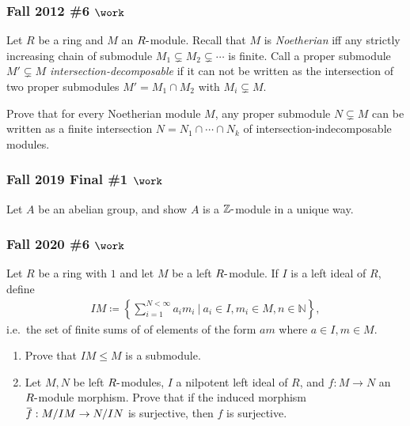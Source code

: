 \hypertarget{fall-2012-6-work}{%
\subsubsection{\texorpdfstring{Fall 2012 \#6
\(\work\)}{Fall 2012 \#6 \textbackslash work}}\label{fall-2012-6-work}}

Let \(R\) be a ring and \(M\) an \(R{\hbox{-}}\)module. Recall that
\(M\) is \emph{Noetherian} iff any strictly increasing chain of
submodule \(M_1 \subsetneq M_2 \subsetneq \cdots\) is finite. Call a
proper submodule \(M' \subsetneq M\) \emph{intersection-decomposable} if
it can not be written as the intersection of two proper submodules
\(M' = M_1\cap M_2\) with \(M_i \subsetneq M\).

Prove that for every Noetherian module \(M\), any proper submodule
\(N\subsetneq M\) can be written as a finite intersection
\(N = N_1 \cap\cdots \cap N_k\) of intersection-indecomposable modules.

\hypertarget{fall-2019-final-1-work}{%
\subsubsection{\texorpdfstring{Fall 2019 Final \#1
\(\work\)}{Fall 2019 Final \#1 \textbackslash work}}\label{fall-2019-final-1-work}}

Let \(A\) be an abelian group, and show \(A\) is a
\({\mathbb{Z}}{\hbox{-}}\)module in a unique way.

\hypertarget{fall-2020-6-work}{%
\subsubsection{\texorpdfstring{Fall 2020 \#6
\(\work\)}{Fall 2020 \#6 \textbackslash work}}\label{fall-2020-6-work}}

Let \(R\) be a ring with \(1\) and let \(M\) be a left
\(R{\hbox{-}}\)module. If \(I\) is a left ideal of \(R\), define
\begin{align*}
IM \coloneqq\left\{{ \sum_{i=1}^{N < \infty} a_i m_i {~\mathrel{\Big|}~}a_i \in I, m_i \in M, n\in {\mathbb{N}}}\right\}
,\end{align*}
i.e.~the set of finite sums of of elements of the form \(am\) where
\(a\in I, m\in M\).

\begin{enumerate}
\def\labelenumi{\alph{enumi}.}
\item
  Prove that \(IM \leq M\) is a submodule.
\item
  Let \(M, N\) be left \(R{\hbox{-}}\)modules, \(I\) a nilpotent left
  ideal of \(R\), and \(f: M\to N\) an \(R{\hbox{-}}\)module morphism.
  Prove that if the induced morphism
  \(\mkern 1.5mu\overline{\mkern-1.5muf\mkern-1.5mu}\mkern 1.5mu: M/IM \to N/IN\)
  is surjective, then \(f\) is surjective.
\end{enumerate}

